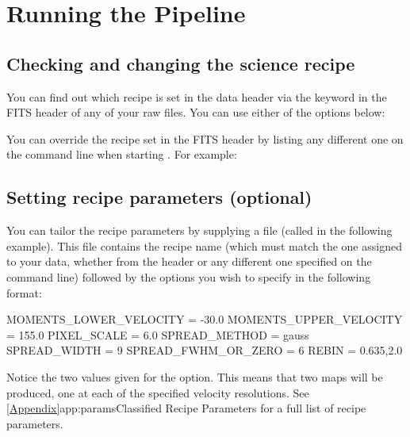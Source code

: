 \documentclass[11pt,oneside,chapters]{starlink}
\begin{document}
\clearpage
\chapter{Running the Pipeline}
\label{sec:runpipe}

\section{Checking and changing the science recipe}
\label{sec:changerecipe}
You can find out which recipe is set in the data header via the
 keyword in the FITS header of any of your raw files.
You can use either of the options below:
\begin{terminalv}
\end{terminalv}

You can override the recipe set in the FITS header by listing any different
one on the command line when starting \ORACDR. For example:
\begin{terminalv}
\end{terminalv}

\section{Setting recipe parameters (optional)}
\label{sec:recpars}

You can tailor the recipe parameters by supplying a  file
(called  in the following example). This file contains the
recipe name (which must match the one assigned to your data, whether
from the header or any different one specified on the command line)
followed by the options you wish to specify in the following format:

\vspace{0.2cm}
\begin{terminalv}
MOMENTS_LOWER_VELOCITY = -30.0
MOMENTS_UPPER_VELOCITY = 155.0
PIXEL_SCALE = 6.0
SPREAD_METHOD = gauss
SPREAD_WIDTH = 9
SPREAD_FWHM_OR_ZERO = 6
REBIN = 0.635,2.0
\end{terminalv}

Notice the two values given for the  option. This means
that two maps will be produced, one at each of the specified velocity
resolutions. See \cref{Appendix}{app:params}{Classified Recipe
Parameters} for a full list of recipe
parameters.
\end{document}
